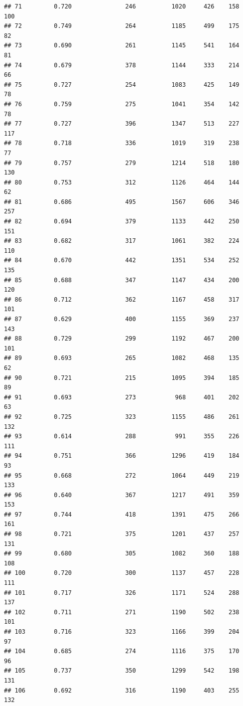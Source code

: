 \documentclass[]{book}
\begin{document}
\begin{verbatim}
## 71         0.720               246          1020     426    158    100
## 72         0.749               264          1185     499    175     82
## 73         0.690               261          1145     541    164     81
## 74         0.679               378          1144     333    214     66
## 75         0.727               254          1083     425    149     78
## 76         0.759               275          1041     354    142     78
## 77         0.727               396          1347     513    227    117
## 78         0.718               336          1019     319    238     77
## 79         0.757               279          1214     518    180    130
## 80         0.753               312          1126     464    144     62
## 81         0.686               495          1567     606    346    257
## 82         0.694               379          1133     442    250    151
## 83         0.682               317          1061     382    224    110
## 84         0.670               442          1351     534    252    135
## 85         0.688               347          1147     434    200    120
## 86         0.712               362          1167     458    317    101
## 87         0.629               400          1155     369    237    143
## 88         0.729               299          1192     467    200    101
## 89         0.693               265          1082     468    135     62
## 90         0.721               215          1095     394    185     89
## 91         0.693               273           968     401    202     63
## 92         0.725               323          1155     486    261    132
## 93         0.614               288           991     355    226    111
## 94         0.751               366          1296     419    184     93
## 95         0.668               272          1064     449    219    133
## 96         0.640               367          1217     491    359    153
## 97         0.744               418          1391     475    266    161
## 98         0.721               375          1201     437    257    131
## 99         0.680               305          1082     360    188    108
## 100        0.720               300          1137     457    228    111
## 101        0.717               326          1171     524    288    137
## 102        0.711               271          1190     502    238    101
## 103        0.716               323          1166     399    204     97
## 104        0.685               274          1116     375    170     96
## 105        0.737               350          1299     542    198    131
## 106        0.692               316          1190     403    255    132

\end{verbatim}
\end{document}

